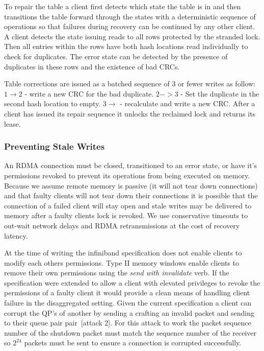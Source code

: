 To repair the table a client first detects which state the
table is in and then transitions the table forward through
the states with a deterministic sequence of operations so
that failures during recovery can be continued by any other
client. A client detects the state issuing reads to all rows
protected by the stranded lock. Then all entries within the
rows have both hash locations read individually to check for
duplicates. The error state can be detected by the presence
of duplicates in these rows and the existence of bad CRCs.

Table corrections are issued as a batched sequence of 3 or
fewer writes as follow: $1 \rightarrow 2$ - write a new CRC
for the bad duplicate.  $2->3$ - Set the duplicate in the
second hash location to empty. $3\rightarrow$ - recalculate
and write a new CRC. After a client has issued its repair
sequence it unlocks the reclaimed lock and returns its
lease.


\subsubsection{Preventing Stale Writes}
\label{sec:stale-writes}

An RDMA connection must be closed, transitioned to an error
state, or have it's permissions revoked to prevent its
operations from being executed on memory. Because we assume
remote memory is passive (it will not tear down connections)
and that faulty clients will not tear down their connections
it is possible that the connection of a failed client will
stay open and stale writes may be delivered to memory after
a faulty clients lock is revoked. We use conservative
timeouts to out-wait network delays and RDMA retransmissions
at the cost of recovery latency. 

At the time of writing the infiniband specification does not
enable clients to modify each others permissions. Type II
memory windows enable clients to remove their own
permissions using the \textit{send with invalidate} verb. If
the specification were extended to allow a client with
elevated privileges to revoke the permissions of a faulty
client it would provide a clean means of handling client
failure in the disaggregated setting. Given the current
specification a client can corrupt the QP's of another by
sending a crafting an invalid packet and sending to their
queue pair pair~\cite{redmark}[attack 2]. For this attack to
work the packet sequence number of the shutdown packet must
match the sequence number of the receiver so $2^{24}$
packets must be sent to ensure a connection is corrupted
successfully.
